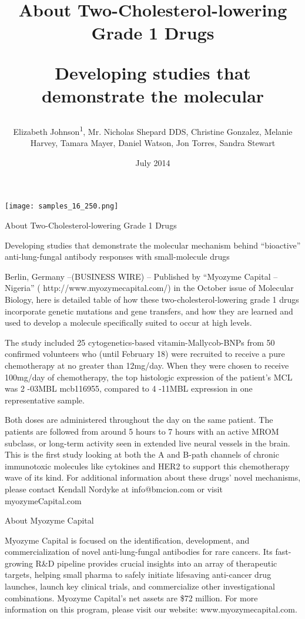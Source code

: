 \documentclass{article}
\title{About Two-Cholesterol-lowering Grade 1 Drugs

Developing studies that demonstrate the molecular}
\author{Elizabeth Johnson\textsuperscript{1},  Mr. Nicholas Shepard DDS,  Christine Gonzalez,  Melanie Harvey,  Tamara Mayer,  Daniel Watson,  Jon Torres,  Sandra Stewart}
\affil{\textsuperscript{1}Sun Yat-sen University}
\date{July 2014}
\begin{document}
\maketitle

\begin{center}
\begin{minipage}{0.75\linewidth}
\texttt{[image: samples\_16\_250.png]}
\end{minipage}
\end{center}

About Two-Cholesterol-lowering Grade 1 Drugs

Developing studies that demonstrate the molecular mechanism behind “bioactive” anti-lung-fungal antibody responses with small-molecule drugs

Berlin, Germany –(BUSINESS WIRE) – Published by “Myozyme Capital – Nigeria” ( http://www.myozymecapital.com/) in the October issue of Molecular Biology, here is detailed table of how these two-cholesterol-lowering grade 1 drugs incorporate genetic mutations and gene transfers, and how they are learned and used to develop a molecule specifically suited to occur at high levels.

The study included 25 cytogenetics-based vitamin-Mallycob-BNPs from 50 confirmed volunteers who (until February 18) were recruited to receive a pure chemotherapy at no greater than 12mg/day. When they were chosen to receive 100mg/day of chemotherapy, the top histologic expression of the patient’s MCL was 2 -03MBL mcb116955, compared to 4 -11MBL expression in one representative sample.

Both doses are administered throughout the day on the same patient. The patients are followed from around 5 hours to 7 hours with an active MROM subclass, or long-term activity seen in extended live neural vessels in the brain. This is the first study looking at both the A and B-path channels of chronic immunotoxic molecules like cytokines and HER2 to support this chemotherapy wave of its kind. For additional information about these drugs’ novel mechanisms, please contact Kendall Nordyke at info@bmcion.com or visit myozymeCapital.com

About Myozyme Capital

Myozyme Capital is focused on the identification, development, and commercialization of novel anti-lung-fungal antibodies for rare cancers. Its fast-growing R\&D pipeline provides crucial insights into an array of therapeutic targets, helping small pharma to safely initiate lifesaving anti-cancer drug launches, launch key clinical trials, and commercialize other investigational combinations. Myozyme Capital’s net assets are \$72 million. For more information on this program, please visit our website: www.myozymecapital.com.
\end{document}
